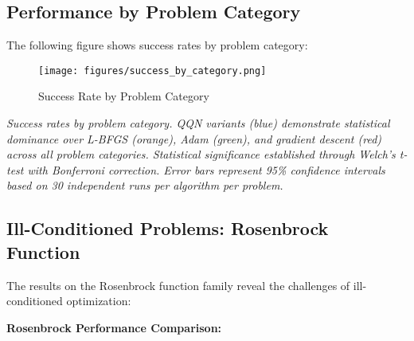 \hypertarget{performance-by-problem-category}{%
\subsection{Performance by Problem Category}\label{performance-by-problem-category}}

The following figure shows success rates by problem category:

\begin{figure}
\centering
\texttt{[image: figures/success\_by\_category.png]}
\caption{Success Rate by Problem Category}
\end{figure}

\emph{Success rates by problem category. QQN variants (blue) demonstrate statistical dominance over L-BFGS (orange), Adam (green), and gradient descent (red) across all problem categories. Statistical significance established through Welch's t-test with Bonferroni correction. Error bars represent 95\% confidence intervals based on 30 independent runs per algorithm per problem.}

\hypertarget{ill-conditioned-problems-rosenbrock-function}{%
\subsection{Ill-Conditioned Problems: Rosenbrock Function}\label{ill-conditioned-problems-rosenbrock-function}}

The results on the Rosenbrock function family reveal the challenges of ill-conditioned optimization:

\textbf{Rosenbrock Performance Comparison:}


